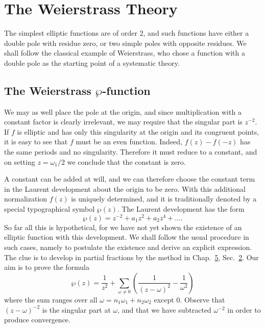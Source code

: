 \setcounter{section}{2}\section{The Weierstrass Theory}\label{sec:7.3}
The simplest elliptic functions are of order 2, and such functions have either a double pole with residue zero, or two simple poles with opposite residues. We shall follow the classical example of Weierstrass, who chose a function with a double pole as the starting point of a systematic theory.

\setcounter{section}{3}\setcounter{subsection}{0}\subsection{\texorpdfstring{The Weierstrass $\wp$-function}{The Weierstrass ℘-function}}\label{sec:7.3.1}
We may as well place the pole at the origin, and since multiplication with a constant factor is clearly irrelevant, we may require that the singular part is $z^{-2}$. If $f$ is elliptic and has only this singularity at the origin and its congruent points, it is easy to see that $f$ must be an even function. Indeed, $f(z) - f(-z)$ has the same periods and no singularity. Therefore it must reduce to a constant, and on setting $z = \omega_1 / 2$ we conclude that the constant is zero.

A constant can be added at will, and we can therefore choose the constant term in the Laurent development about the origin to be zero. With this additional normalization $f(z)$ is uniquely determined, and it is traditionally denoted by a special typographical symbol $\wp(z)$. The Laurent development has the form
\begin{equation*}
\wp (z) = z ^ {- 2} + a _ {1} z ^ {2} + a _ {2} z ^ {4} + \dots .
\end{equation*}
So far all this is hypothetical, for we have not yet shown the existence of an elliptic function with this development. We shall follow the usual procedure in such cases, namely to postulate the existence and derive an explicit expression. The clue is to develop in partial fractions by the method in Chap.~\hyperref[chap:5]{5}, Sec.~\hyperref[sec:5.2]{2}. Our aim is to prove the formula
\begin{equation*}
\wp (z) = \frac {1}{z ^ {2}} + \sum_ {\omega \neq 0} \left(\frac {1}{(z - \omega) ^ {2}} - \frac {1}{\omega^ {2}}\right)\tag{9}\label{eq:7.9}
\end{equation*}
where the sum ranges over all $\omega = n_{1}\omega_{1} + n_{2}\omega_{2}$ except 0. Observe that $(z - \omega)^{-2}$ is the singular part at $\omega$, and that we have subtracted $\omega^{-2}$ in order to produce convergence.

